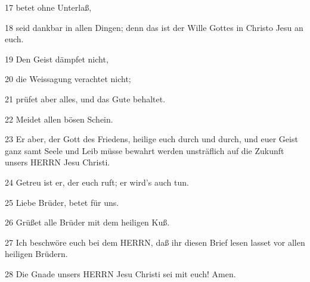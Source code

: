 \par 17 betet ohne Unterlaß,
\par 18 seid dankbar in allen Dingen; denn das ist der Wille Gottes in Christo Jesu an euch.
\par 19 Den Geist dämpfet nicht,
\par 20 die Weissagung verachtet nicht;
\par 21 prüfet aber alles, und das Gute behaltet.
\par 22 Meidet allen bösen Schein.
\par 23 Er aber, der Gott des Friedens, heilige euch durch und durch, und euer Geist ganz samt Seele und Leib müsse bewahrt werden unsträflich auf die Zukunft unsers HERRN Jesu Christi.
\par 24 Getreu ist er, der euch ruft; er wird's auch tun.
\par 25 Liebe Brüder, betet für uns.
\par 26 Grüßet alle Brüder mit dem heiligen Kuß.
\par 27 Ich beschwöre euch bei dem HERRN, daß ihr diesen Brief lesen lasset vor allen heiligen Brüdern.
\par 28 Die Gnade unsers HERRN Jesu Christi sei mit euch! Amen.

